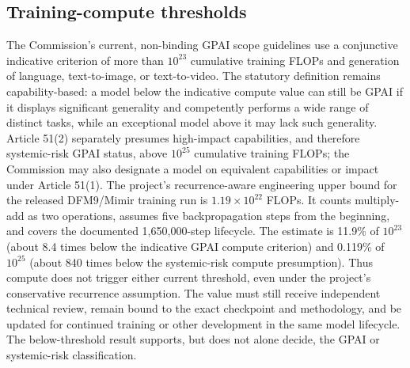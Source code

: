 \documentclass[9pt,a4paper]{article}
\begin{document}
\subsection{Training-compute thresholds}
The Commission's current, non-binding GPAI scope guidelines use a conjunctive indicative criterion of more than $10^{23}$ cumulative training FLOPs and generation of language, text-to-image, or text-to-video. The statutory definition remains capability-based: a model below the indicative compute value can still be GPAI if it displays significant generality and competently performs a wide range of distinct tasks, while an exceptional model above it may lack such generality. Article 51(2) separately presumes high-impact capabilities, and therefore systemic-risk GPAI status, above $10^{25}$ cumulative training FLOPs; the Commission may also designate a model on equivalent capabilities or impact under Article 51(1).
The project's recurrence-aware engineering upper bound for the released DFM9/Mimir training run is $1.19\times10^{22}$ FLOPs. It counts multiply-add as two operations, assumes five backpropagation steps from the beginning, and covers the documented 1,650,000-step lifecycle. The estimate is 11.9\% of $10^{23}$ (about 8.4 times below the indicative GPAI compute criterion) and 0.119\% of $10^{25}$ (about 840 times below the systemic-risk compute presumption). Thus compute does not trigger either current threshold, even under the project's conservative recurrence assumption. The value must still receive independent technical review, remain bound to the exact checkpoint and methodology, and be updated for continued training or other development in the same model lifecycle. The below-threshold result supports, but does not alone decide, the GPAI or systemic-risk classification.
\end{document}
